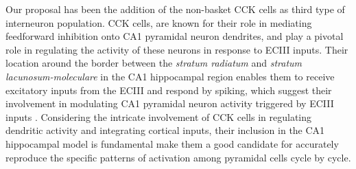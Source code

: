 \documentclass[../main.tex]{subfiles}
\begin{document}
Our proposal has been the addition of the non-basket CCK cells as third type of interneuron population.
CCK cells, are known for their role in mediating feedforward inhibition onto CA1 pyramidal neuron dendrites, and play a pivotal role in regulating the activity of these neurons in response to ECIII inputs.
Their location around the border between the \textit{stratum radiatum} and \textit{stratum lacunosum-moleculare} in the CA1 hippocampal region enables them to receive excitatory inputs from the ECIII and respond by spiking, which suggest their involvement in modulating CA1 pyramidal neuron activity triggered by ECIII inputs \citep{bilash_lateral_2023}.
Considering the intricate involvement of CCK cells in regulating dendritic activity and integrating cortical inputs, their inclusion in the CA1 hippocampal model is fundamental make them a good candidate for accurately reproduce the specific patterns of activation among pyramidal cells cycle by cycle.
\end{document}
